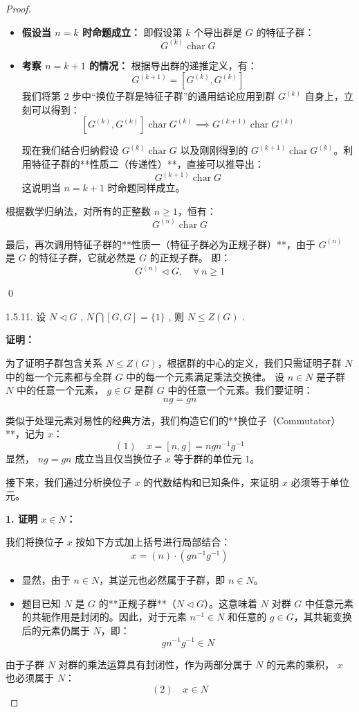 \documentclass[]{article}
\begin{document}
\begin{proof}
\begin{itemize}
	\item \textbf{假设当 $n = k$ 时命题成立：}
	即假设第 $k$ 个导出群是 $G$ 的特征子群：
	\[ G^{(k)} \operatorname{char} G \]
	
	\item \textbf{考察 $n = k + 1$ 的情况：}
	根据导出群的递推定义，有：
	\[ G^{(k+1)} = [G^{(k)}, G^{(k)}] \]
	我们将第 2 步中“换位子群是特征子群”的通用结论应用到群 $G^{(k)}$ 自身上，立刻可以得到：
	\[ [G^{(k)}, G^{(k)}] \operatorname{char} G^{(k)} \implies G^{(k+1)} \operatorname{char} G^{(k)} \]
	
	现在我们结合归纳假设 $G^{(k)} \operatorname{char} G$ 以及刚刚得到的 $G^{(k+1)} \operatorname{char} G^{(k)}$。利用特征子群的**性质二（传递性）**，直接可以推导出：
	\[ G^{(k+1)} \operatorname{char} G \]
	这说明当 $n = k+1$ 时命题同样成立。
\end{itemize}

根据数学归纳法，对所有的正整数 $n \ge 1$，恒有：
\[ G^{(n)} \operatorname{char} G \]

最后，再次调用特征子群的**性质一（特征子群必为正规子群）**，由于 $G^{(n)}$ 是 $G$ 的特征子群，它就必然是 $G$ 的正规子群。
即：
\[ G^{(n)} \triangleleft G, \quad \forall \, n \geqslant 1 \]

\qed

1.5.11. 设 $N \triangleleft G$ , $N \bigcap [G, G] = \{1\}$ , 则 $N \leqslant Z(G)$ . 

\bigskip
\noindent \textbf{证明：} 

为了证明子群包含关系 $N \leqslant Z(G)$，根据群的中心的定义，我们只需证明子群 $N$ 中的每一个元素都与全群 $G$ 中的每一个元素满足乘法交换律。
设 $n \in N$ 是子群 $N$ 中的任意一个元素， $g \in G$ 是群 $G$ 中的任意一个元素。我们要证明：
\[ ng = gn \]

类似于处理元素对易性的经典方法，我们构造它们的**换位子（Commutator）**，记为 $x$：
\[ (1) \quad x = [n, g] = n g n^{-1} g^{-1} \]
显然， $ng = gn$ 成立当且仅当换位子 $x$ 等于群的单位元 $1$。

接下来，我们通过分析换位子 $x$ 的代数结构和已知条件，来证明 $x$ 必须等于单位元。

\bigskip
\noindent \textbf{1. 证明 $x \in N$：}

我们将换位子 $x$ 按如下方式加上括号进行局部结合：
\[ x = (n) \cdot (g n^{-1} g^{-1}) \]
\begin{itemize}
	\item 显然，由于 $n \in N$，其逆元也必然属于子群，即 $n \in N$。
	\item 题目已知 $N$ 是 $G$ 的**正规子群**（$N \triangleleft G$）。这意味着 $N$ 对群 $G$ 中任意元素的共轭作用是封闭的。因此，对于元素 $n^{-1} \in N$ 和任意的 $g \in G$，其共轭变换后的元素仍属于 $N$，即：
	\[ g n^{-1} g^{-1} \in N \]
\end{itemize}
由于子群 $N$ 对群的乘法运算具有封闭性，作为两部分属于 $N$ 的元素的乘积， $x$ 也必须属于 $N$：
\[ (2) \quad x \in N \]


\end{proof}
\end{document}
